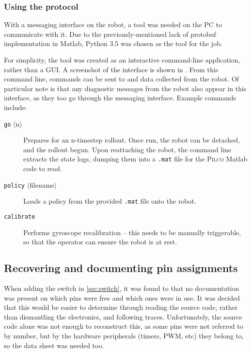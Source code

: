 \documentclass[main.tex]{subfiles}
\begin{document}

	\subsubsection{Using the protocol}

		With a messaging interface on the robot, a tool was needed on the PC to communicate with it.
		Due to the previously-mentioned lack of protobuf implementation in Matlab, Python 3.5 was chosen as the tool for the job.

		For simplicity, the tool was created as an interactive command-line application, rather than a GUI.
		A screenshot of the interface is shown in .
		From this command line, commands can be sent to and data collected from the robot.
		Of particular note is that any diagnostic messages from the robot also appear in this interface, as they too go through the messaging interface. Example commands include:
		\begin{description}
			\item[\texttt{go} $\langle$n$\rangle$]
				Prepares for an n-timestep rollout. Once run, the robot can be detached, and the rollout begun. Upon reattaching the robot, the command line extracts the state logs, dumping them into a \texttt{.mat} file for the \textsc{Pilco} Matlab code to read.
			\item[\texttt{policy}  $\langle$filename$\rangle$]
				Loads a policy from the provided \texttt{.mat} file onto the robot.
			\item[\texttt{calibrate}]
				Performs gyroscope recalibration -- this needs to be manually triggerable, so that the operator can ensure the robot is at rest.
		\end{description}

\subsection{Recovering and documenting pin assignments}
	\label{sec:pins}

	When adding the switch in \cref{sec:switch}, it was found to that no documentation was present on which pins were free and which ones were in use. It was decided that this would be easier to determine through reading the source code, rather than dismantling the electronics, and following traces.
	Unfortunately, the source code alone was not enough to reconstruct this, as some pins were not referred to by number, but by the hardware peripherals (timers, PWM, etc) they belong to, so the data sheet was needed too.
\end{document}
